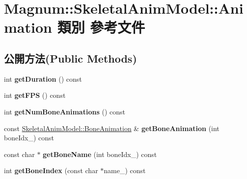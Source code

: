 \hypertarget{class_magnum_1_1_skeletal_anim_model_1_1_animation}{}\section{Magnum\+:\+:Skeletal\+Anim\+Model\+:\+:Animation 類別 參考文件}
\label{class_magnum_1_1_skeletal_anim_model_1_1_animation}
\subsection*{公開方法(Public Methods)}
\begin{DoxyCompactItemize}
\item 
int {\bfseries get\+Duration} () const \hypertarget{class_magnum_1_1_skeletal_anim_model_1_1_animation_a5a6c49b8d501ba819f2611d6530957ca}{}\label{class_magnum_1_1_skeletal_anim_model_1_1_animation_a5a6c49b8d501ba819f2611d6530957ca}

\item 
int {\bfseries get\+F\+PS} () const \hypertarget{class_magnum_1_1_skeletal_anim_model_1_1_animation_a296b4d3b55215138c242b5a336fa5017}{}\label{class_magnum_1_1_skeletal_anim_model_1_1_animation_a296b4d3b55215138c242b5a336fa5017}

\item 
int {\bfseries get\+Num\+Bone\+Animations} () const \hypertarget{class_magnum_1_1_skeletal_anim_model_1_1_animation_a13cbab16efefa17c23eec1d290d7a3d5}{}\label{class_magnum_1_1_skeletal_anim_model_1_1_animation_a13cbab16efefa17c23eec1d290d7a3d5}

\item 
const \hyperlink{class_magnum_1_1_skeletal_anim_model_1_1_bone_animation}{Skeletal\+Anim\+Model\+::\+Bone\+Animation} \& {\bfseries get\+Bone\+Animation} (int bone\+Idx\+\_\+) const \hypertarget{class_magnum_1_1_skeletal_anim_model_1_1_animation_af8e8f5d1bff5af4584d219b4831822a6}{}\label{class_magnum_1_1_skeletal_anim_model_1_1_animation_af8e8f5d1bff5af4584d219b4831822a6}

\item 
const char $\ast$ {\bfseries get\+Bone\+Name} (int bone\+Idx\+\_\+) const \hypertarget{class_magnum_1_1_skeletal_anim_model_1_1_animation_a35608a4c8a6bb43eb38da74b847dc97d}{}\label{class_magnum_1_1_skeletal_anim_model_1_1_animation_a35608a4c8a6bb43eb38da74b847dc97d}

\item 
int {\bfseries get\+Bone\+Index} (const char $\ast$name\+\_\+) const \hypertarget{class_magnum_1_1_skeletal_anim_model_1_1_animation_aa489c9b8359e5ab6bb6c1f5b64fcb100}{}\label{class_magnum_1_1_skeletal_anim_model_1_1_animation_aa489c9b8359e5ab6bb6c1f5b64fcb100}


\end{DoxyCompactItemize}

